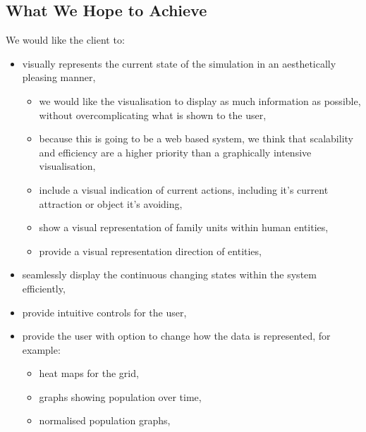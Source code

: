 \subsection{What We Hope to Achieve}
We would like the client to:
\begin{itemize}
	\item visually represents the current state of the simulation in an aesthetically pleasing manner,
	\begin{itemize}
		\item we would like the visualisation to display as much information as possible, without overcomplicating what is shown to the user,
		\item because this is going to be a web based system, we think that scalability and efficiency are a higher priority than a graphically intensive visualisation,
		\item include a visual indication of current actions, including it's current attraction or object it's avoiding,
		\item show a visual representation of family units within human entities, 
		\item provide a visual representation direction of entities,
	\end{itemize}
	\item seamlessly display the continuous changing states within the system efficiently,
	\item provide intuitive controls for the user,
	\item provide the user with option to change how the data is represented, for example:
	\begin{itemize}
		\item heat maps for the grid,
		\item graphs showing population over time,
		\item normalised population graphs,
	\end{itemize}
\end{itemize}

\clearpage
\endinput
